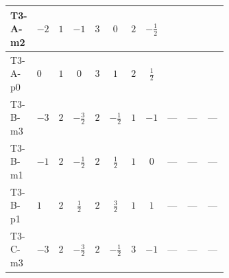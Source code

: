 \documentclass[8pt]{article}
\begin{document}
\begin{landscape}
\begin{longtable}{@{}llcccccc >{\raggedright\arraybackslash}p{0.21\linewidth} >{\raggedright\arraybackslash}p{0.21\linewidth} >{\raggedright\arraybackslash}p{0.21\linewidth}@{}}
\midrule
T3-A-m2 & $-2$ & $1$ & $-1$ & $3$ & $0$ & $2$ & $-\frac{1}{2}$ & \scriptsize\adjustbox{max width=\linewidth}{$\begin{gathered} {\lambda_{HS_2}^{(A)}} (2 T_{\nu}^{(2)}+6 \operatorname{Tr}\!\left({Y_d}\,\left({Y_d}\right)^{\dagger}\right)+2 \operatorname{Tr}\!\left({Y_e}\,\left({Y_e}\right)^{\dagger}\right)+6 \operatorname{Tr}\!\left({Y_u}\,\left({Y_u}\right)^{\dagger}\right)+16 {\lambda_{S_2}^{(A)}})\end{gathered}$} & \scriptsize\adjustbox{max width=\linewidth}{$\begin{gathered} +\frac{4}{3} \operatorname{Tr}\!\left({y_2}\,\left({y_2}\right)^{\dagger}\,{Y_e}\,\left({Y_e}\right)^{\dagger}\right)\end{gathered}$} & \scriptsize\adjustbox{max width=\linewidth}{$\begin{gathered} +\frac{8}{3} {\lambda_5} \left({\lambda_5}\right)^{*}\end{gathered}$} \\
\midrule
T3-A-p0 & $0$ & $1$ & $0$ & $3$ & $1$ & $2$ & $\frac{1}{2}$ & \scriptsize\adjustbox{max width=\linewidth}{$\begin{gathered} {\lambda_{HS_2}^{(A)}} (2 T_{\nu}^{(2)}+6 \operatorname{Tr}\!\left({Y_d}\,\left({Y_d}\right)^{\dagger}\right)+2 \operatorname{Tr}\!\left({Y_e}\,\left({Y_e}\right)^{\dagger}\right)+6 \operatorname{Tr}\!\left({Y_u}\,\left({Y_u}\right)^{\dagger}\right)+16 {\lambda_{S_2}^{(A)}})\end{gathered}$} & \scriptsize\adjustbox{max width=\linewidth}{$\begin{gathered} +\frac{4}{3} \operatorname{Tr}\!\left({y_2}\,\left({y_2}\right)^{\dagger}\,{Y_e}\,\left({Y_e}\right)^{\dagger}\right)\end{gathered}$} & \scriptsize\adjustbox{max width=\linewidth}{$\begin{gathered} +\frac{8}{3} {\lambda_5} \left({\lambda_5}\right)^{*}\end{gathered}$} \\
\midrule
T3-B-m3 & $-3$ & $2$ & $-\frac{3}{2}$ & $2$ & $-\frac{1}{2}$ & $1$ & $-1$ & --- & --- & --- \\
\midrule
T3-B-m1 & $-1$ & $2$ & $-\frac{1}{2}$ & $2$ & $\frac{1}{2}$ & $1$ & $0$ & --- & --- & --- \\
\midrule
T3-B-p1 & $1$ & $2$ & $\frac{1}{2}$ & $2$ & $\frac{3}{2}$ & $1$ & $1$ & --- & --- & --- \\
\midrule
T3-C-m3 & $-3$ & $2$ & $-\frac{3}{2}$ & $2$ & $-\frac{1}{2}$ & $3$ & $-1$ & --- & --- & --- \\

\end{longtable}
\end{landscape}
\end{document}
